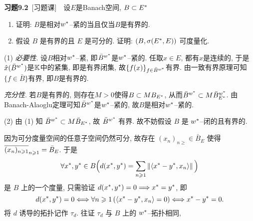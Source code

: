     \textbf{习题9.2}\ [习题课]\ \ 设$ E $是Banach空间, $ B\subset\Star{E} $
    \begin{enumerate}[(1)]
        \item 证明: $ B $是相对$ \Star{w} $--紧的当且仅当$ B $是有界的.
        \item 假设 $ B $ 是有界的且 $ E $ 是可分的. 证明: $ (B, \sigma(\Star{E}, E)) $ 可度量化.
    \end{enumerate}
    \begin{Proof}
    (1) \textsl{必要性}. 设$ B $相对$ \Star{w} $--紧, 即$ \bar{B}^{\Star{w}} $是$ \Star{w} $--紧的. 任取$ x\in E $, 都有$ \hat{x} $是连续的, 于是$ \hat{x}(\bar{B}^{\Star{w}}) $是$ \K $中的紧集, 即是有界闭集, 故$ \{ f(x) \}_{f\in \bar{B}^{\Star{w}}} $有界. 由一致有界原理可知$ \{ f\in\bar{B} \} $有界, 即$ B $是有界的.
    
    \textsl{充分性}. 若$ B $是有界的, 则存在$ M>0 $使得$ B\subset MB_{\Star{E}} $, 从而$ \bar{B}^{\Star{w}}\subset M\bar{B}_{\Star{E}}^{\Star{w}} $. 由Banach-Alaoglu定理可知$ \bar{B}^{\Star{w}} $是$ \Star{w} $--紧的, 故$ B $是相对$ \Star{w} $--紧的.

    (2) 由 (1) 知 $ \bar{B}^{\Star{w}}\subset M\bar{B}_{\Star{E}} $, 故 $ \bar{B}^{\Star{w}}  $ 有界. 故不妨假设 $ B $ 是 $ \Star{w} $--闭的且有界的.

    因为可分度量空间的任意子空间仍然可分, 故存在 $ (x_{n})_{n\geqslant}\in\bar{B}_{E} $ 使得 $ \baro{(x_{n})_{n\geqslant1}}_{n\geqslant1}=\bar{B}_{E} $. 于是
    \[
        \forall \Star{x}, \Star{y}\in B\Big(d(\Star{x}, \Star{y})=\sum_{n\geqslant1}\norm{\lrangle{\Star{x}-\Star{y}, x_{n}}}\Big)
    \]
    是 $ B $ 上的一个度量, 只需验证 $ d(\Star{x}, \Star{y})=0\Longrightarrow \Star{x}=\Star{y} $, 即
    \[
        d(\Star{x}, \Star{y})=0\Longleftrightarrow \forall n\geqslant1\,(\lrangle{\Star{x}-\Star{y}, x_{n}}=0)\Longleftrightarrow \Star{x}-\Star{y}=0.
    \]
    将 $ d $ 诱导的拓扑记作 $ \tau_{d} $. 往证 $ \tau_{d} $ 与 $ B $ 上的 $ \Star{w} $--拓扑相同, 


\end{Proof}
